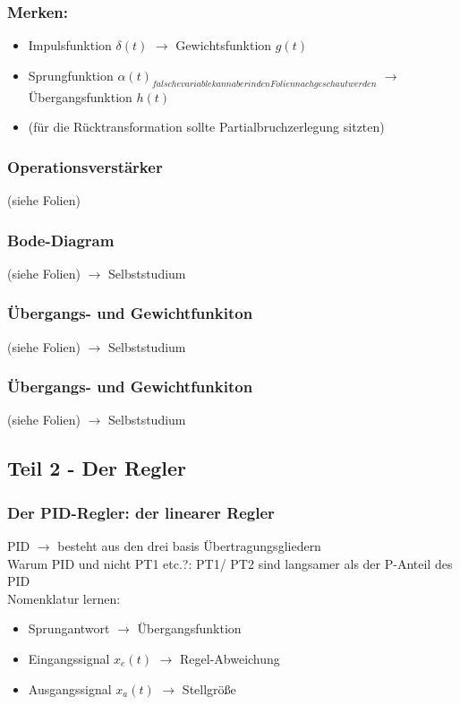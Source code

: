 \documentclass{article}
\begin{document}
\subsubsection*{Merken:}
\begin{itemize}
	\item Impulsfunktion $\delta (t)$ $\rightarrow$ Gewichtsfunktion $g(t)$
	\item Sprungfunktion $\alpha (t) _{falsche variable kann aber in den Folien nachgeschaut werden}$ $\rightarrow$ Übergangsfunktion $h(t)$
	\item (für die Rücktransformation sollte Partialbruchzerlegung sitzten)
\end{itemize}

\subsubsection*{Operationsverstärker}
(siehe Folien)

\subsubsection*{Bode-Diagram}
(siehe Folien) $\rightarrow$ Selbststudium

\subsubsection*{Übergangs- und Gewichtfunkiton}
(siehe Folien) $\rightarrow$ Selbststudium

\subsubsection*{Übergangs- und Gewichtfunkiton}
(siehe Folien) $\rightarrow$ Selbststudium

\newpage
\subsection*{Teil 2 - Der Regler}
\subsubsection*{Der PID-Regler: der linearer Regler}
PID $\rightarrow$ besteht aus den drei basis Übertragungsgliedern \\
Warum PID und nicht PT1 etc.?: PT1/ PT2 sind langsamer als der P-Anteil des PID \\

Nomenklatur lernen: 
\begin{itemize}
	\item Sprungantwort $\rightarrow$ Übergangsfunktion
	\item Eingangssignal $x_e(t)$ $\rightarrow$ Regel-Abweichung
	\item Ausgangssignal $x_a(t)$ $\rightarrow$ Stellgröße
\end{itemize}
\end{document}
